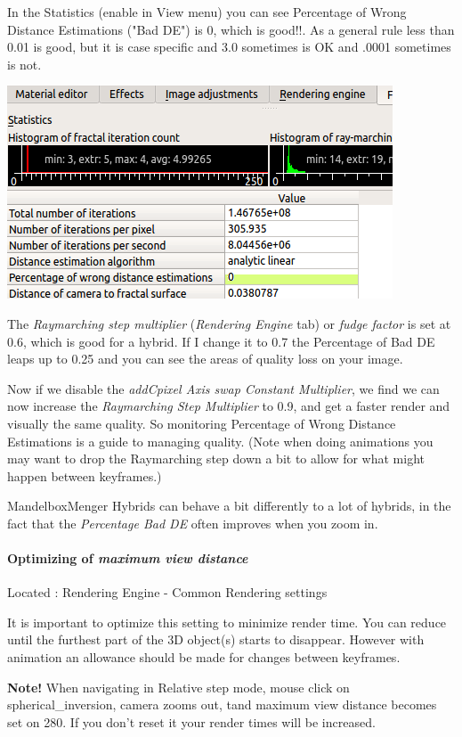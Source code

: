 In the Statistics (enable in View menu) you can see Percentage of Wrong Distance
Estimations ("Bad DE") is 0, which is good!!. As a general rule less than 0.01
is good, but it is case specific and 3.0 sometimes is OK and .0001 sometimes is
not.
\nopagebreak

\includegraphics[width=0.5\linewidth]{img/manual/media/mandelboxmenger_statistics.png}

The \emph{Raymarching step multiplier} (\emph{Rendering Engine} tab) or
\emph{fudge factor} is set at 0.6, which is good for a hybrid. If I change it to
0.7 the Percentage of Bad DE leaps up to 0.25 and you can see the areas of
quality loss on your image.

Now if we disable the \emph{addCpixel Axis swap Constant Multiplier}, we find we
can now increase the \emph{Raymarching Step Multiplier} to 0.9, and get a faster
render and visually the same quality. So monitoring Percentage of Wrong Distance
Estimations is a guide to managing quality. (Note when doing animations you may
want to drop the Raymarching step down a bit to allow for what might happen
between keyframes.)

MandelboxMenger Hybrids can behave a bit differently to a lot of hybrids, in the
fact that the \emph{Percentage Bad DE} often improves when you zoom in.

\paragraph{Optimizing of \emph{maximum view distance}} Located : Rendering
Engine - Common Rendering settings

It is important to optimize this setting to minimize render time. You can reduce
until the furthest part of the 3D object(s) starts to disappear. However with
animation an allowance should be made for changes between keyframes.

\textbf{Note!} When navigating in Relative step mode, mouse click on
spherical\_inversion, camera zooms out, tand maximum view distance becomes set
on 280. If you don't reset it your render times will be increased.
	

